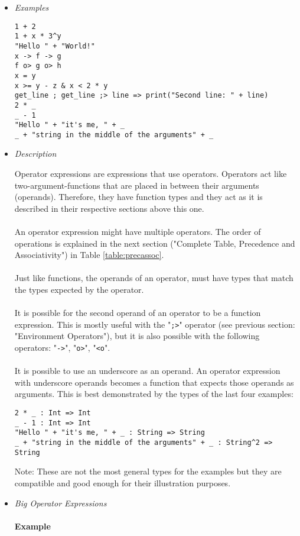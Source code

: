 \documentclass{article}
\begin{document}
\begin{itemize}
\item \textit{Examples}
\begin{verbatim}
1 + 2
1 + x * 3^y
"Hello " + "World!"
x -> f -> g
f o> g o> h
x = y
x >= y - z & x < 2 * y
get_line ; get_line ;> line => print("Second line: " + line)
2 * _
_ - 1
"Hello " + "it's me, " + _ 
_ + "string in the middle of the arguments" + _
\end{verbatim}

\item \textit{Description}

Operator expressions are expressions that use operators. Operators act like
two-argument-functions that are placed in between their arguments (operands).
Therefore, they have function types and they act as it is described in their
respective sections above this one.
\\\\
An operator expression might have multiple operators. The order of operations
is explained in the next section ("Complete Table, Precedence and Associativity")
in Table \ref{table:precassoc}.
\\\\
Just like functions, the operands of an operator, must have types that match
the types expected by the operator.
\\\\
It is possible for the second operand of an operator to be a function expression.
This is mostly useful with the "\texttt{;>}" operator (see previous section:
"Environment Operators"), but it is also possible with the following operators:
"\texttt{->}", "\texttt{o>}", "\texttt{<o}".
\\\\
It is possible to use an underscore as an operand. An operator expression with 
underscore operands becomes a function that expects those operands as arguments.
This is best demonstrated by the types of the last four examples: 

\begin{verbatim}
2 * _ : Int => Int
_ - 1 : Int => Int
"Hello " + "it's me, " + _ : String => String
_ + "string in the middle of the arguments" + _ : String^2 => String
\end{verbatim}
Note: These are not the most general types for the examples but they are compatible
and good enough for their illustration purposes.

\item \textit{Big Operator Expressions}\\\\
\textbf{Example}


\end{itemize}
\end{document}
